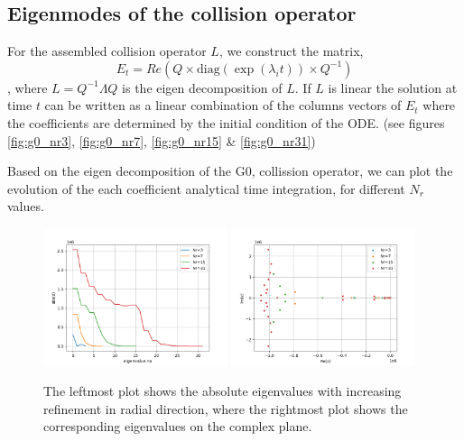 \documentclass{article}
\begin{document}
\subsection{Eigenmodes of the collision operator}
For the assembled collision operator $L$, we construct the matrix, 
\begin{equation}
	E_t = Re\left( Q \times  \text{diag}(\exp(\lambda_i t)) \times Q^{-1} \right) 
\end{equation}, where $L=Q^{-1} \Lambda Q$ is the eigen decomposition of $L$. If $L$ is linear the solution at time $t$ can be written as a linear combination of the columns vectors of $E_t$ where the coefficients are determined by the initial condition of the ODE. (see figures \ref{fig:g0_nr3}, \ref{fig:g0_nr7}, \ref{fig:g0_nr15} \& \ref{fig:g0_nr31})

Based on the eigen decomposition of the G0, collission operator, we can plot the evolution of the each coefficient analytical time integration, for different $N_r$ values. 

\begin{figure}[!htbp]
	\centering
	\includegraphics[width=0.48\textwidth]{fig/g0_eig_abs_nr.png}
	\includegraphics[width=0.48\textwidth]{fig/g0_eig_nr.png}
	\caption{The leftmost plot shows the absolute eigenvalues with  increasing refinement in radial direction, where the rightmost plot shows the corresponding eigenvalues on the complex plane.\label{fig:g0_eig_nr}}
\end{figure}
\end{document}
